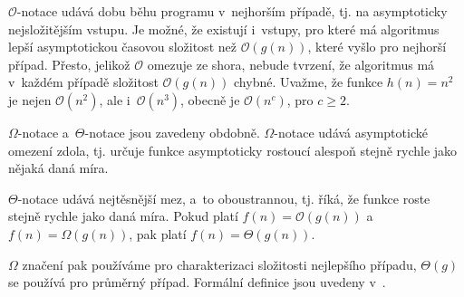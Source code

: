 \documentclass[12pt]{report}			%
\begin{document}
			$\mathcal{O}$-notace udává dobu běhu programu v~nejhorším případě, tj. na asymptoticky nejsložitějším vstupu. Je možné, že existují i~vstupy, pro které má algoritmus lepší asymptotickou časovou složitost než $\mathcal{O}(g(n))$, které vyšlo pro nejhorší případ. Přesto, jelikož $\mathcal{O}$ omezuje ze shora, nebude tvrzení, že algoritmus má v~každém případě složitost $\mathcal{O}(g(n))$ chybné. Uvažme, že funkce $h(n)=n^2$ je nejen $\mathcal{O}(n^2)$, ale i~$\mathcal{O}(n^3)$, obecně je $\mathcal{O}(n^c)$, pro $c \geq 2$.
			
			$\Omega$-notace a~$\Theta$-notace jsou zavedeny obdobně. $\Omega$-notace udává asymptotické omezení zdola, tj. určuje funkce asymptoticky rostoucí alespoň stejně rychle jako nějaká daná míra.
			
			$\Theta$-notace udává nejtěsnější mez, a~to oboustrannou, tj. říká, že funkce roste stejně rychle jako daná míra. Pokud platí 
$f(n) = \mathcal{O}(g(n))$ a~$f(n) = \Omega(g(n))$, pak platí $f(n) = \Theta(g(n))$.

			$\Omega$ značení pak používáme pro charakterizaci složitosti nejlepšího případu, $\Theta(g)$ se používá pro průměrný případ.
			Formální definice jsou uvedeny v~\cite{intro}.
			

			
			
\end{document}
